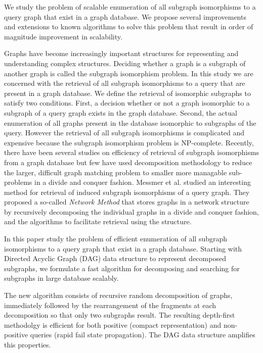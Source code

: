 We study the problem of scalable enumeration of all subgraph isomorphisms to a query graph that exist in a graph database. We  propose several improvements and extensions to known algorithms to solve this problem that result in order of magnitude improvement in scalability. 

Graphs have become increasingly important structures for representing and understanding complex structures. Deciding whether a graph is a subgraph of another graph is called the subgraph isomorphism problem. In this study we are concerned with the retrieval of all subgraph isomorphisms to a query that are present in a graph database.
We define the retrieval of isomorphic subgraphs to satisfy two conditions.  First, a decision whether or not a graph isomorphic to a subgraph of a query graph exists in the graph database. Second, the actual enumeration of all graphs present in the database isomorphic to subgraphs of the query. However the retrieval of all subgraph isomorphisms is complicated and expensive because the subgraph isomorphism problem is NP-complete.
Recently, there have been several studies on efficiency of retrieval of subgraph isomorphisms from a graph database but few have used decomposition methodology to reduce the larger, difficult graph matching problem to smaller more managable sub-problems in a divide and conquer fashion. Messmer et al. studied an interesting method for retrieval of induced subgraph isomorphisms of a query graph. They proposed a so-called \textit{Network Method} that stores graphs  in a network structure  by recursively decomposing the individual graphs in a divide and conquer fashion, and the algorithms to facilitate retrieval using the structure.


In this paper study the problem of efficient enumeration of all subgraph isomorphisms to a query graph that exist in a graph database. Starting with Directed Acyclic Graph (DAG) data structure to represent decomposed subgraphs, we formulate a fast algorithm for decomposing and searching for subgraphs in large database scalably.

The new algorithm consists of recursive random decomposition of graphs, immediately followed by the rearrangement of the fragments at each decomposition so that only two subgraphs result. The resulting depth-first methodolgy is efficient for both positive (compact representation) and non-positive queries (rapid fail state propagation). The DAG data structure amplifies this properties.

